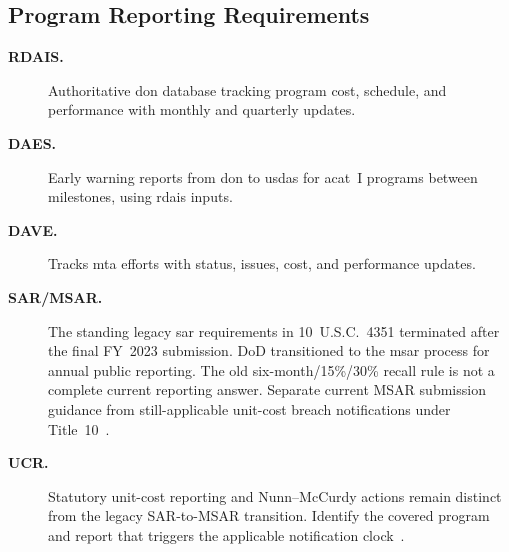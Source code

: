 \documentclass[../main.tex]{subfiles}
\begin{document}
\subsection{Program Reporting Requirements}
\begin{description}
  \item[\textbf{RDAIS.}] Authoritative \ac{don} database tracking program cost, schedule, and performance with monthly and quarterly updates.
  \item[\textbf{DAES.}] Early warning reports from \ac{don} to \ac{usdas} for \ac{acat}~I programs between milestones, using \ac{rdais} inputs.
  \item[\textbf{DAVE.}] Tracks \ac{mta} efforts with status, issues, cost, and performance updates.
  \item[\textbf{SAR/MSAR.}] The standing legacy \ac{sar} requirements in 10~U.S.C.\ 4351 terminated after the final FY~2023 submission. DoD transitioned to the \ac{msar} process for annual public reporting. The old six-month/15\%/30\% recall rule is not a complete current reporting answer. Separate current MSAR submission guidance from still-applicable unit-cost breach notifications under Title~10~\autocite{USC-10-4351,DOD-MSAR-Transition-2023,USC-10-4374}.
  \item[\textbf{UCR.}] Statutory unit-cost reporting and Nunn--McCurdy actions remain distinct from the legacy SAR-to-MSAR transition. Identify the covered program and report that triggers the applicable notification clock~\autocite{USC-4371-NunnMcCurdy,USC-10-4374}.
\end{description}
\end{document}
